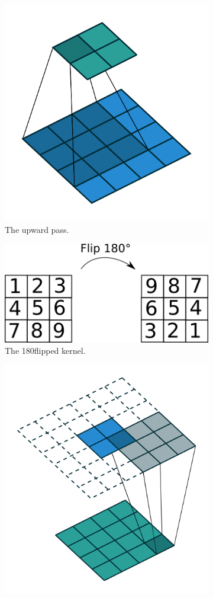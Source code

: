 \begin{figure}
	\centering
	\begin{subfigure}[t]{.30\textwidth}
  		\centering
  		\includegraphics[width=.6\linewidth]{imgs/crbm_padding1.png}
  		\caption{The upward pass.}
  		\label{fig:convrbmsub1}
	\end{subfigure}%
	\begin{subfigure}[t]{.30\textwidth}
  		\centering
  		\includegraphics[width=.8\linewidth]{imgs/kernel_flip.png}
  		\caption{The 180\textdegree flipped kernel.}
  		\label{fig:convrbmsub2}
	\end{subfigure}
	\begin{subfigure}[t]{.30\textwidth}
  		\centering
  		\includegraphics[width=.8\linewidth]{imgs/crbm_padding2.png}

\end{subfigure}
\end{figure}
